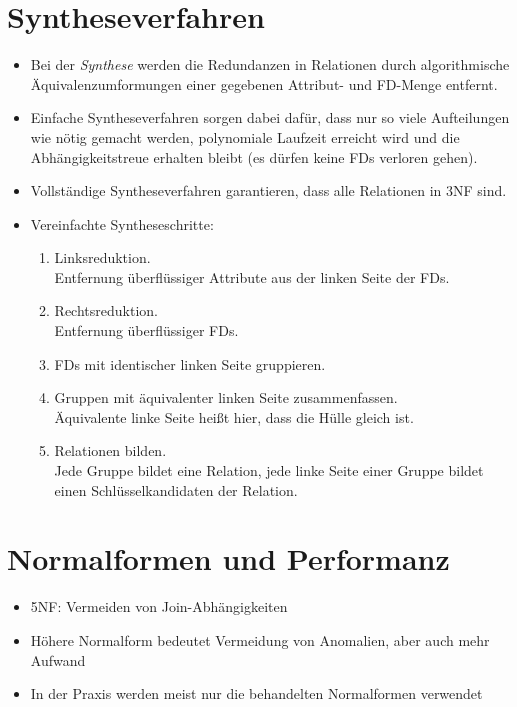     \section{Syntheseverfahren} %
        \begin{itemize}
        	\item Bei der \textit{Synthese} werden die Redundanzen in Relationen durch algorithmische Äquivalenzumformungen einer gegebenen Attribut- und FD-Menge entfernt.
        	\item Einfache Syntheseverfahren sorgen dabei dafür, dass nur so viele Aufteilungen wie nötig gemacht werden, polynomiale Laufzeit erreicht wird und die Abhängigkeitstreue erhalten bleibt (es dürfen keine FDs verloren gehen).
        	\item Vollständige Syntheseverfahren garantieren, dass alle Relationen in 3NF sind.
        	\item Vereinfachte Syntheseschritte:
        		\begin{enumerate}
        			\item Linksreduktion. \\ Entfernung überflüssiger Attribute aus der linken Seite der FDs.
        			\item Rechtsreduktion. \\ Entfernung überflüssiger FDs.
        			\item FDs mit identischer linken Seite gruppieren.
        			\item Gruppen mit äquivalenter linken Seite zusammenfassen. \\ Äquivalente linke Seite heißt hier, dass die Hülle gleich ist.
        			\item Relationen bilden. \\ Jede Gruppe bildet eine Relation, jede linke Seite einer Gruppe bildet einen Schlüsselkandidaten der Relation.
        		\end{enumerate}
        \end{itemize}

	\section{Normalformen und Performanz} %
	 	\begin{itemize}
			\item 5NF: Vermeiden von Join-Abhängigkeiten
			\item Höhere Normalform bedeutet Vermeidung von Anomalien, aber auch mehr Aufwand
			\item In der Praxis werden meist nur die behandelten Normalformen verwendet
		\end{itemize}

